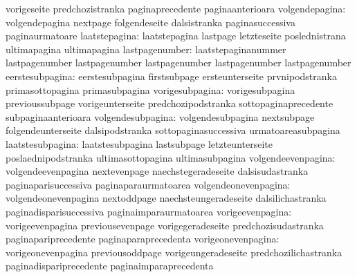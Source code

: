                            vorigeseite               predchozistranka
                           paginaprecedente          paginaanterioara
           volgendepagina: volgendepagina            nextpage
                           folgendeseite             dalsistranka
                           paginasuccessiva          paginaurmatoare
            laatstepagina: laatstepagina             lastpage
                           letzteseite               poslednistrana
                           ultimapagina              ultimapagina
           lastpagenumber: laatstepaginanummer       lastpagenumber
                           lastpagenumber            lastpagenumber
                           lastpagenumber            lastpagenumber
          eerstesubpagina: eerstesubpagina           firstsubpage
                           ersteunterseite           prvnipodstranka
                           primasottopagina          primasubpagina
          vorigesubpagina: vorigesubpagina           previoussubpage
                           vorigeunterseite          predchozipodstranka
                           sottopaginaprecedente     subpaginaanterioara
        volgendesubpagina: volgendesubpagina         nextsubpage
                           folgendeunterseite        dalsipodstranka
                           sottopaginasuccessiva     urmatoareasubpagina
         laatstesubpagina: laatstesubpagina          lastsubpage
                           letzteunterseite          poslaednipodstranka
                           ultimasottopagina         ultimasubpagina
       volgendeevenpagina: volgendeevenpagina        nextevenpage
                           naechstegeradeseite       dalsisudastranka
                           paginaparisuccessiva      paginaparaurmatoarea
     volgendeonevenpagina: volgendeonevenpagina      nextoddpage
                           naechsteungeradeseite     dalsilichastranka
                           paginadisparisuccessiva   paginaimparaurmatoarea
         vorigeevenpagina: vorigeevenpagina          previousevenpage
                           vorigegeradeseite         predchozisudastranka
                           paginapariprecedente      paginaparaprecedenta
       vorigeonevenpagina: vorigeonevenpagina        previousoddpage
                           vorigeungeradeseite       predchozilichastranka
                           paginadispariprecedente   paginaimparaprecedenta

